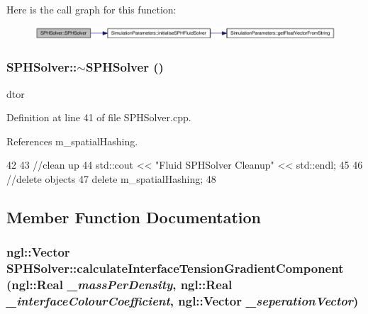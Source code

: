 Here is the call graph for this function:\nopagebreak
\begin{figure}[H]
\begin{center}
\leavevmode
\includegraphics[width=342pt]{class_s_p_h_solver_abe3a0bdf9c42b4213944bc0332020e65_cgraph}
\end{center}
\end{figure}


\hypertarget{class_s_p_h_solver_a81a0ee1c05b649912faa1e9839f71883}{
\subsubsection[{$\sim$SPHSolver}]{\setlength{\rightskip}{0pt plus 5cm}SPHSolver::$\sim$SPHSolver ()}}
\label{class_s_p_h_solver_a81a0ee1c05b649912faa1e9839f71883}


dtor 



Definition at line 41 of file SPHSolver.cpp.



References m\_\-spatialHashing.




\begin{DoxyCode}
42 {
43     //clean up
44     std::cout << "Fluid SPHSolver Cleanup" << std::endl;
45 
46     //delete objects
47     delete m_spatialHashing;
48 }
\end{DoxyCode}




\subsection{Member Function Documentation}
\hypertarget{class_s_p_h_solver_af6b1adebbc96d3cb22f6990a05694f70}{
\subsubsection[{calculateInterfaceTensionGradientComponent}]{\setlength{\rightskip}{0pt plus 5cm}ngl::Vector SPHSolver::calculateInterfaceTensionGradientComponent (ngl::Real {\em \_\-massPerDensity}, \/  ngl::Real {\em \_\-interfaceColourCoefficient}, \/  ngl::Vector {\em \_\-seperationVector})}}
\label{class_s_p_h_solver_af6b1adebbc96d3cb22f6990a05694f70}


